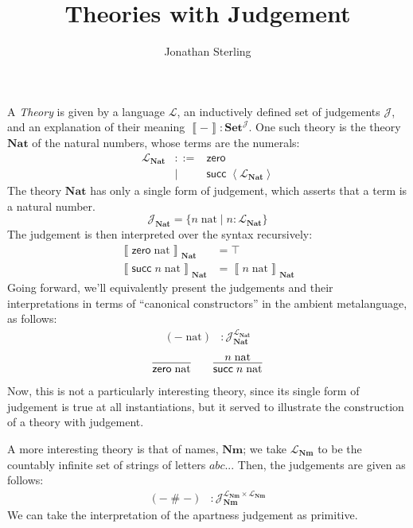 \documentclass{amsart}
\theoremstyle{definition}
\theoremstyle{remark}
\numberwithin{equation}{section}
\newcommand{\SET}{\textbf{Set}}
\newcommand{\sem}[1]{\left\llbracket#1\right\rrbracket}
\newcommand{\quo}[1]{\left\langle#1\right\rangle}
\begin{document}
\title{Theories with Judgement}
\author{Jonathan Sterling}
\address{AlephCloud Systems}

\maketitle

A \emph{Theory} is given by a language $\mathcal{L}$, an inductively defined set of judgements
$\mathcal{J}$, and an explanation of their meaning $\sem{-} :
\SET^\mathcal{J}$.  One such theory is the theory $\mathbf{Nat}$ of the natural
numbers, whose terms are the numerals:
\[
  \begin{array}{lcl}
    \mathcal{L}_\mathbf{Nat}
      &::= &\mathsf{zero}\\
      &\mid &\mathsf{succ}\;\quo{\mathcal{L}_\mathbf{Nat}}
  \end{array}
\]
The theory $\mathbf{Nat}$ has only a single form of judgement, which asserts that a term is a natural number.
\[
  \mathcal{J}_\mathbf{Nat} = \{n\;\mathrm{nat} \mid n : \mathcal{L}_\mathbf{Nat} \}
\]
The judgement is then interpreted over the syntax recursively:
\begin{align*}
  \sem{\mathsf{zero}\;\mathrm{nat}}_\mathbf{Nat} &= \top\\
  \sem{\mathsf{succ}\;n\;\mathrm{nat}}_\mathbf{Nat} &= \sem{n\;\mathrm{nat}}_\mathbf{Nat}
\end{align*}
Going forward, we'll equivalently present the judgements and their
interpretations in terms of ``canonical constructors'' in the ambient
metalanguage, as follows:
\begin{align*}
  (-\;\mathrm{nat}) &: \mathcal{J}_\mathbf{Nat}^{\mathcal{L}_\mathbf{Nat}}
\end{align*}
\begin{gather*}
  \infer{\mathsf{zero}\;\mathrm{nat}}{}
  \qquad
  \infer{\mathsf{succ}\;n\;\mathrm{nat}}{n\;\mathrm{nat}}
\end{gather*}
Now, this is not a particularly interesting theory, since its single form of
judgement is true at all instantiations, but it served to illustrate the
construction of a theory with judgement.

A more interesting theory is that of names, $\mathbf{Nm}$; we take
$\mathcal{L}_\mathbf{Nm}$ to be the countably infinite set of strings of
letters $abc...$ Then, the judgements are given as follows:
\begin{align*}
  (-\mathop{\#}-) &: \mathcal{J}_\mathbf{Nm}^{\mathcal{L}_\mathbf{Nm}\times\mathcal{L}_\mathbf{Nm}}
  \tag{Apartness}
\end{align*}
We can take the interpretation of the apartness judgement as primitive.
\end{document}
